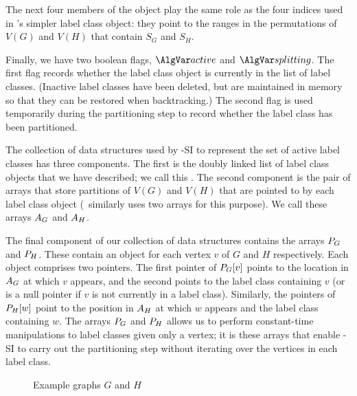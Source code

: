 The next four members of the object play the same role as the four indices used in \McSplit's
simpler label class object: they point to the ranges in the permutations of $V(G)$ and $V(H)$ that
contain $S_G$ and $S_H$.

Finally, we have two boolean flags, $\varActive$ and $\varSplitting$.  The first flag
records whether the label class object is currently in the list of label classes.  (Inactive
label classes have been deleted, but are maintained in memory so that they can be restored
when backtracking.)  The second flag is used temporarily during the partitioning step
to record whether the label class has been partitioned.

The collection of data structures used by \McSplit-SI to represent the set of
active label classes has three components.  The first is the doubly linked
list of label class objects that we have described; we call this \calLC.  The
second component is the pair of arrays that store partitions of $V(G)$ and
$V(H)$ that are pointed to by each label class object (\McSplit\ similarly uses
two arrays for this purpose).   We call these arrays $A_G$ and $A_H$.

The final component of our collection of data structures contains the arrays $P_G$
and $P_H$.  These contain
an object for each vertex $v$ of $G$ and $H$ respectively.  Each object comprises two pointers.
The first pointer of $P_G[v]$ points to the location in $A_G$ at which $v$
appears, and the second points to the label class containing $v$ (or is a null pointer
if $v$ is not currently in a label class).
Similarly, the pointers of $P_H[w]$ point to the position in $A_H$ at which $w$
appears and the label class containing $w$.
The arrays $P_G$ and $P_H$ allows us to perform constant-time
manipulations to label classes given only a vertex; it is these arrays that enable
\McSplit-SI to carry out the partitioning step without iterating over the vertices in each label class.

\begin{figure}[htb]
    \centering
    \caption{Example graphs $G$ and $H$}
    \label{figure:example-g-and-h-redux}
\end{figure}

